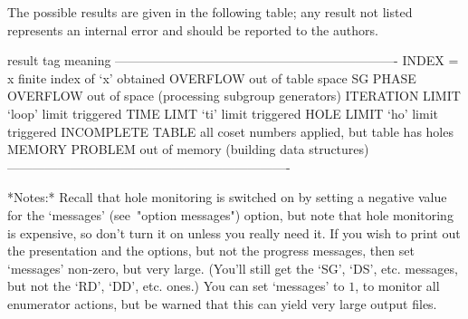
The possible results are given in the following table; any result  not
listed represents an internal error and  should  be  reported  to  the
{\ACE} authors.

\begintt
result tag           meaning 
-------------------------------------------------------------------
INDEX = x            finite index of `x' obtained
OVERFLOW             out of table space
SG PHASE OVERFLOW    out of space (processing subgroup generators)
ITERATION LIMIT      `loop' limit triggered
TIME LIMT            `ti' limit triggered
HOLE LIMIT           `ho' limit triggered
INCOMPLETE TABLE     all coset numbers applied, but table has holes
MEMORY PROBLEM       out of memory (building data structures)
-------------------------------------------------------------------
\endtt


*Notes:*
Recall that hole monitoring is switched on by setting a negative value
for the `messages' (see~"option messages") option, but note that  hole
monitoring is expensive, so don't turn it on unless  you  really  need
it. If you wish to print out the presentation and the options, but not
the progress messages, then set `messages' non-zero, but  very  large.
(You'll still get the `SG', `DS', etc. messages,  but  not  the  `RD',
`DD', etc. ones.) You can  set  `messages'  to  $1$,  to  monitor  all
enumerator actions, but be warned  that  this  can  yield  very  large
output files.

